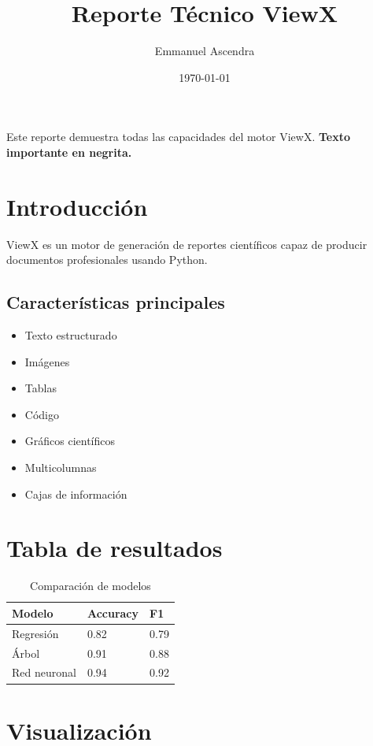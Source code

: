 \documentclass{article}%
\title{Reporte Técnico ViewX}%
\author{Emmanuel Ascendra}%
\date{\today}%
\begin{document}
%
\normalsize%
\pgfplotsset{compat=1.18}%
\maketitle%
Este reporte demuestra todas las capacidades del motor ViewX.\newline%
%
\textbf{Texto importante en negrita.}%
\section{Introducción}%
\label{sec:Introduccin}%
ViewX es un motor de generación de reportes científicos capaz de producir documentos profesionales usando Python.

%
\subsection{Características principales}%
\label{subsec:Caractersticasprincipales}%
\begin{itemize}%
\item%
Texto estructurado%
\item%
Imágenes%
\item%
Tablas%
\item%
Código%
\item%
Gráficos científicos%
\item%
Multicolumnas%
\item%
Cajas de información%
\end{itemize}

%
\section{Tabla de resultados}%
\label{sec:Tabladeresultados}%
\begin{table}[H]\centering
\caption{Comparación de modelos}
\begin{tabular}{l | l | l}\hline
Modelo & Accuracy & F1\\ \hline
Regresión & 0.82 & 0.79\\ \hline
Árbol & 0.91 & 0.88\\ \hline
Red neuronal & 0.94 & 0.92\\ \hline
\end{tabular}\end{table}

%
\section{Visualización}%
\label{sec:Visualizacin}%
\end{document}
